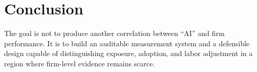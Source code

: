 \section{Conclusion}
The goal is not to produce another correlation between ``AI'' and firm performance. It is to build an auditable measurement system and a defensible design capable of distinguishing exposure, adoption, and labor adjustment in a region where firm-level evidence remains scarce.
